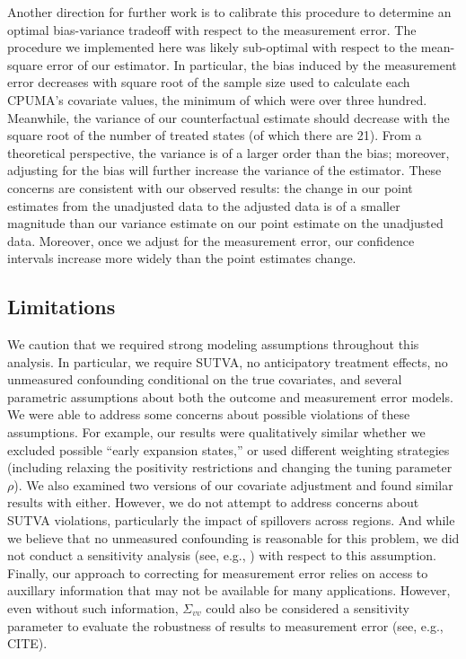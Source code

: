 \documentclass[aoas]{imsart}
\theoremstyle{plain}
\theoremstyle{remark}
\begin{document}
Another direction for further work is to calibrate this procedure to determine an optimal bias-variance tradeoff with respect to the measurement error. The procedure we implemented here was likely sub-optimal with respect to the mean-square error of our estimator. In particular, the bias induced by the measurement error decreases with square root of the sample size used to calculate each CPUMA's covariate values, the minimum of which were over three hundred. Meanwhile, the variance of our counterfactual estimate should decrease with the square root of the number of treated states (of which there are 21). From a theoretical perspective, the variance is of a larger order than the bias; moreover, adjusting for the bias will further increase the variance of the estimator. These concerns are consistent with our observed results: the change in our point estimates from the unadjusted data to the adjusted data is of a smaller magnitude than our variance estimate on our point estimate on the unadjusted data. Moreover, once we adjust for the measurement error, our confidence intervals increase more widely than the point estimates change.

\subsection{Limitations}

We caution that we required strong modeling assumptions throughout this analysis. In particular, we require SUTVA, no anticipatory treatment effects, no unmeasured confounding conditional on the true covariates, and several parametric assumptions about both the outcome and measurement error models. We were able to address some concerns about possible violations of these assumptions. For example, our results were qualitatively similar whether we excluded possible ``early expansion states,'' or used different weighting strategies (including relaxing the positivity restrictions and changing the tuning parameter $\rho$). We also examined two versions of our covariate adjustment and found similar results with either. However, we do not attempt to address concerns about SUTVA violations, particularly the impact of spillovers across regions. And while we believe that no unmeasured confounding is reasonable for this problem, we did not conduct a sensitivity analysis (see, e.g., \cite{bonvini2021sensitivity}) with respect to this assumption. Finally, our approach to correcting for measurement error relies on access to auxillary information that may not be available for many applications. However, even without such information, $\Sigma_{vv}$ could also be considered a sensitivity parameter to evaluate the robustness of results to measurement error (see, e.g., CITE).
\end{document}
